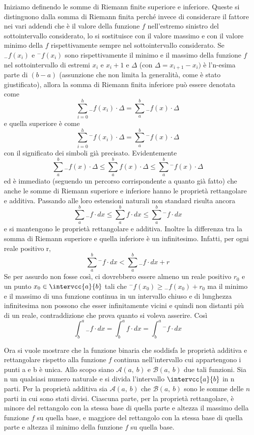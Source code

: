 Iniziamo definendo le somme di Riemann finite superiore e inferiore. Queste 
si distinguono dalla somma di Riemann finita perché invece di considerare il 
fattore nei vari addendi che è il valore della funzione \(f\) nell'estremo 
sinistro del sottointervallo considerato, lo si sostituisce con il valore 
massimo e con il valore minimo della \(f\) rispettivamente sempre nel 
sottointervallo considerato. Se \({}_{-}f(x_i)\) e \({}^{-}f(x_i)\) sono 
rispettivamente il minimo e il massimo della funzione \(f\) nel 
sottointervallo 
di estremi \(x_i\) e \(x_i+1\) 
e \(\Delta\) (con \(\Delta =x_{i+1} - x_i)\) 
è l'n-esima parte di \((b - a)\) 
(assunzione che non limita la generalità, come è stato giustificato), 
allora la somma di Riemann finita inferiore può essere denotata come 
\[\sum_{i=0}^h{}_{-}f(x_i)\cdot\Delta = \sum_a^b{}_{-} f(x) \cdot \Delta\] 
e quella superiore è come 
\[\sum_{i=0}^h {}^{-}f(x_i)\cdot\Delta = 
  \sum_a^b {}^{-}f(x) \cdot \Delta\] 
con il significato dei simboli già precisato.
Evidentemente 
\[\sum_a^b{}_{-}f(x) \cdot \Delta \le \sum_a^b f(x) \cdot \Delta \le 
\sum_a^b {}^{-}f(x) \cdot \Delta\] 
ed è immediato (seguendo un percorso corrispondente a quanto già fatto) che 
anche le somme di Riemann superiore e inferiore hanno le proprietà 
rettangolare 
e additiva. 
  Passando alle loro estensioni naturali non standard risulta ancora 
\[\sum_a^b {}_{-}f \cdot dx \le \sum_a^b f \cdot dx \le 
  \sum_a^b {}^{-}f \cdot dx\] 
e si mantengono le proprietà rettangolare e additiva. 
Inoltre la differenza tra la somma di Riemann superiore e quella inferiore è 
un infinitesimo. Infatti, per ogni reale positivo r, 
\[\sum_a^b {}^{-}f \cdot dx < \sum_a^b {}_{-}f \cdot dx +r\] 
Se per assurdo non fosse così, ci dovrebbero essere almeno un reale 
positivo \(r_0\) e un punto \(x_0 \in \intervcc{a}{b}\) tali che 
\({}^{-}f(x_0) \ge {}_{-}f(x_0)+r_0\) 
ma il minimo e il massimo di una funzione continua in un intervallo chiuso e 
di lunghezza infinitesima non possono che esser infinitamente vicini e quindi 
non distanti più di un reale, contraddizione che prova quanto si voleva 
asserire. Così 
\[\int_b^a {}_{-}f \cdot dx = \int_b^a f \cdot dx = 
  \int_b^a {}^{-}f \cdot dx\]
  
Ora si vuole mostrare che la funzione binaria che soddisfa le proprietà 
additiva e rettangolare rispetto alla funzione \(f\) continua nell'intervallo 
cui appartengono i punti a e b è unica.
Allo scopo siano \(\mathcal{A}(a,~b)\) e \(\mathcal{B}(a,~b)\) due tali 
funzioni. 
Sia n un qualsiasi numero naturale e si divida l'intervallo 
\(\intervcc{a}{b}\) in n parti. 
Per la proprietà 
additiva sia \(\mathcal{A}(a,~b)\) che \(\mathcal{B}(a,~b)\) sono le somme 
delle \(n\) 
parti in cui sono stati divisi. 
Ciascuna parte, per la proprietà rettangolare, è minore del 
rettangolo con la stessa base di quella parte e altezza il massimo della 
funzione \(f\) su quella base, e maggiore del rettangolo con la stessa base 
di 
quella parte e altezza il minimo della funzione \(f\) su quella base. 

